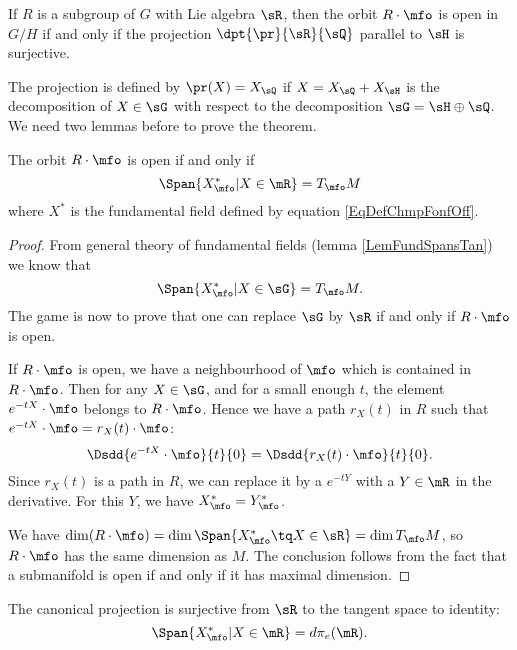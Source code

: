 \begin{theorem} \label{tho:pr_ouvert}
If $R$ is a subgroup of $G$ with Lie algebra $\sR$, then the orbit $R\cdot \mfo$ is open in $G/H$ if and only if the projection $\dpt{\pr}{\sR}{\sQ}$ parallel to $\sH$ is surjective.
\end{theorem}

The projection is defined by $\pr(X)=X_{\sQ}$ if $X=X_{\sQ}+X_{\sH}$ is the decomposition of $X\in\sG$ with respect to the decomposition $\sG=\sH\oplus\sQ$. We need two lemmas before to prove the theorem.

\begin{lemma}
The orbit $R\cdot\mfo$ is open if and only if
\[
    \Span\{X^*_{\mfo}|X\in\mR\}=T_{\mfo}M
\]
where $X^*$ is the fundamental field defined by equation \eqref{EqDefChmpFonfOff}.
\label{lem:equiv_1}
\end{lemma}

\begin{proof}
From general theory of fundamental fields (lemma \ref{LemFundSpansTan}) we know that
\[
\Span\{X^*_{\mfo}|X\in\sG\}=T_{\mfo}M.
\]
The game is now to prove that one can replace $\sG$ by $\sR$ if and only if $R\cdot \mfo$ is open.

If $R\cdot\mfo$ is open, we have a neighbourhood of $\mfo$ which is contained in $R\cdot\mfo$. Then for any $X\in\sG$, and for a small enough $t$, the element $e^{-tX}\cdot\mfo$ belongs to $R\cdot\mfo$. Hence we have a path $r_X(t)$ in $R$ such that $e^{-tX}\cdot\mfo=r_X(t)\cdot\mfo$:
\[
      \Dsdd{e^{-tX}\cdot\mfo}{t}{0}=\Dsdd{r_X(t)\cdot\mfo}{t}{0}.
\]
Since $r_X(t)$ is a path in $R$, we can replace it by a $e^{-tY}$ with a $Y\in\mR$ in the derivative. For this $Y$, we have $X^*_{\mfo}=Y^*_{\mfo}$.

 We have $\dim(R\cdot\mfo)=\dim\Span\{ X^*_{\mfo}\tq X\in\sR \}=\dim T_{\mfo}M$,
so $R\cdot\mfo$ has the same dimension as $M$. The conclusion follows from the fact that a submanifold is open if and only if it has maximal dimension.

\end{proof}

\begin{lemma}
The canonical projection is surjective from $\sR$ to the tangent space to identity:
\begin{equation}\label{eq:equiv_2}
    \Span\{X^*_{\mfo}|X\in\mR\}=d\pi_e(\mR).
\end{equation}

\label{XsdpiR}

\end{lemma}

